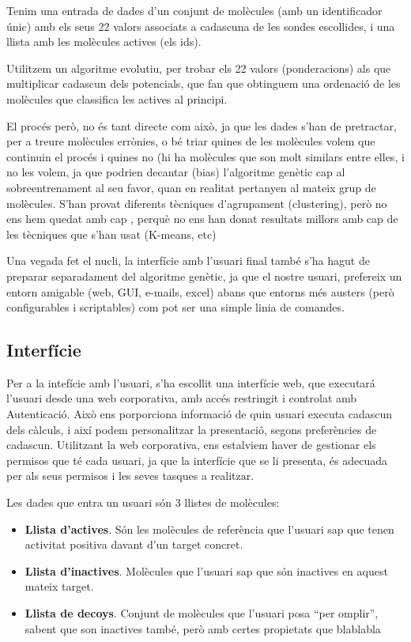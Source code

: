 \documentclass[titlepage,a4paper,12pt]{book}
\begin{document}
Tenim una entrada de dades d'un conjunt de molècules (amb un identificador
únic) amb els seus 22 valors associats a cadascuna de les sondes escollides, i una
llista amb les molècules actives (els ids).

Utilitzem un algoritme evolutiu, per trobar els 22 valors (ponderacions) als que
multiplicar cadascun dels potencials, que fan que obtinguem una ordenació de les
molècules que classifica les actives al principi.

El procés però, no és tant directe com això, ja que les dades s'han de
pretractar, per a treure molècules errònies, o bé triar quines de les molècules
volem que continuin el procés i quines no (hi ha molècules que son molt similars
entre elles, i no les volem, ja que podrien decantar (bias) l'algoritme genètic cap al
sobreentrenament al seu favor, quan en realitat pertanyen al mateix grup de
molècules.  S'han provat diferents tècniques d'agrupament (clustering), però no ens hem
quedat amb cap , perquè no ens han donat resultats millors amb cap de les
tècniques que s'han usat (K-means, etc) %

Una vegada fet el nucli, la interfície amb l'usuari final també s'ha hagut
de preparar separadament del algoritme genètic, ja que el nostre usuari,
prefereix un entorn amigable (web, GUI, e-mails, excel) abans que entorns més
austers (però configurables i scriptables) com pot ser una simple linia de
comandes.  

\subsection{Interfície} %
\label{sub:Interficie}

Per a la intefície amb l'usuari, s'ha escollit una interfície web, que executará
l'usuari desde una web corporativa, amb accés restringit i controlat amb
Autenticació.  Això ens porporciona informació de quin usuari executa cadascun
dels càlculs, i així podem personalitzar la presentació, segons preferències de
cadascun.  Utilitzant la web corporativa, ens estalviem haver de gestionar els
permisos que té cada usuari, ja que la interfície que se li presenta, és
adecuada per als seus permisos i les seves tasques a realitzar.

Les dades que entra un usuari són 3 llistes de molècules:

\begin{itemize}
	\item \textbf{Llista d'actives}.  Són les molècules de referència que l'usuari sap
	que tenen activitat positiva davant d'un target concret.
	\item \textbf{Llista d'inactives}.  Molècules que l'usuari sap que són inactives en
	aquest mateix target.
	\item \textbf{Llista de decoys}.  Conjunt de molècules que l'usuari posa ``per
	omplir'', sabent que son inactives també, però amb certes propietats que
	blablabla %
\end{itemize}
\end{document}
